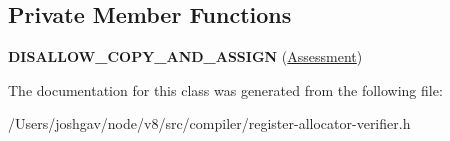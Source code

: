 \subsection*{Private Member Functions}
\begin{DoxyCompactItemize}
\item 
{\bfseries D\+I\+S\+A\+L\+L\+O\+W\+\_\+\+C\+O\+P\+Y\+\_\+\+A\+N\+D\+\_\+\+A\+S\+S\+I\+GN} (\hyperlink{classv8_1_1internal_1_1compiler_1_1_assessment}{Assessment})\hypertarget{classv8_1_1internal_1_1compiler_1_1_assessment_aefde439e84038080e95404bf4cf67de5}{}\label{classv8_1_1internal_1_1compiler_1_1_assessment_aefde439e84038080e95404bf4cf67de5}

\end{DoxyCompactItemize}


The documentation for this class was generated from the following file\+:\begin{DoxyCompactItemize}
\item 
/\+Users/joshgav/node/v8/src/compiler/register-\/allocator-\/verifier.\+h\end{DoxyCompactItemize}
